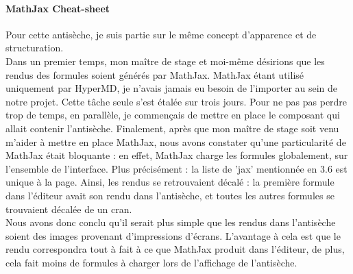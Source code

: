 \documentclass[12pt]{article}
\begin{document}
\paragraph{MathJax Cheat-sheet}
Pour cette antisèche, je suis partie sur le même concept d'apparence et de structuration.\\
Dans un premier temps, mon maître de stage et moi-même désirions que les rendus des formules soient générés par MathJax. MathJax étant utilisé uniquement par HyperMD, je n'avais jamais eu besoin de l'importer au sein de notre projet. Cette tâche seule s'est étalée sur trois jours. Pour ne pas pas perdre trop de temps, en parallèle, je commençais de mettre en place le composant qui allait contenir l'antisèche. Finalement, après que mon maître de stage soit venu m'aider à mettre en place MathJax, nous avons constater qu'une particularité de MathJax était bloquante : en effet, MathJax charge les formules globalement, sur l'ensemble de l'interface. Plus précisément : la liste de 'jax' mentionnée en 3.6 est unique à la page. Ainsi, les rendus se retrouvaient décalé : la première formule dans l'éditeur avait son rendu dans l'antisèche, et toutes les autres formules se trouvaient décalée de un cran.\\
Nous avons donc conclu qu'il serait plus simple que les rendus dans l'antisèche soient des images provenant d'impressions d'écrans. L'avantage à cela est que le rendu correspondra tout à fait à ce que MathJax produit dans l'éditeur, de plus, cela fait moins de formules à charger lors de l'affichage de l'antisèche.
\end{document}
